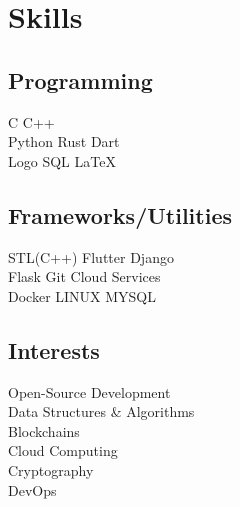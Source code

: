 \documentclass[letterpaper]{deedy-resume} %
\begin{document}
\begin{minipage}[t]{0.33\textwidth}
\section{Skills}

\subsection{Programming}

\textbullet{} C \textbullet{} C++ \\ 

\textbullet{} Python \textbullet{} Rust \textbullet{} Dart\\ \textbullet{} Logo \textbullet{} SQL \textbullet{} \LaTeX\ 

\sectionspace %

\subsection{Frameworks/Utilities}

\textbullet{} STL(C++) \textbullet{} Flutter \textbullet{} Django\\ 
\textbullet{} Flask \textbullet{} Git \textbullet{} Cloud Services\\
\textbullet{} Docker \textbullet{} LINUX \textbullet{} MYSQL

\sectionspace %

\subsection{Interests}

\textbullet{} Open-Source Development\\ \textbullet{} Data Structures \& Algorithms\\
\textbullet{} Blockchains\\
\textbullet{} Cloud Computing\\ \textbullet{} Cryptography\\ 
\textbullet{} DevOps


\end{minipage} %
\hfill
%
\end{document}
